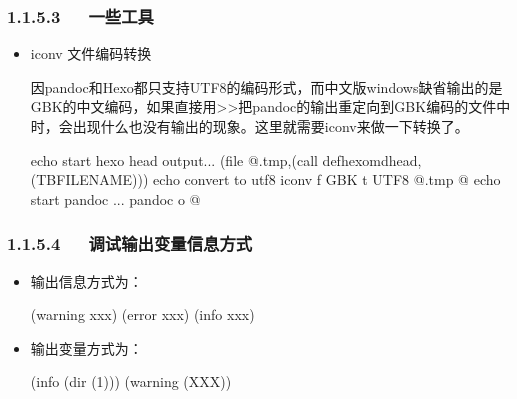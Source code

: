 \documentclass[letterpaper,12pt,english]{sphinxmanual}
\begin{document}
\subsubsection{1.1.5.3   一些工具}
\label{\detokenize{001software/001install/make:id17}}\begin{itemize}
\item {} 
iconv 文件编码转换

因pandoc和Hexo都只支持UTF\sphinxhyphen{}8的编码形式，而中文版windows缺省输出的是GBK的中文编码，如果直接用>>把pandoc的输出重定向到GBK编码的文件中时，会出现什么也没有输出的现象。这里就需要iconv来做一下转换了。

\begin{sphinxVerbatim}[commandchars=\\\{\}]
echo start hexo head output...
\PYGZdl{}\PYGZdl{}(file \PYGZgt{}\PYGZdl{}\PYGZdl{}@.tmp,\PYGZdl{}\PYGZdl{}(call def\PYGZus{}hexo\PYGZus{}md\PYGZus{}head,\PYGZdl{}\PYGZdl{}(TBFILENAME)))
echo convert to utf8
iconv \PYGZhy{}f GBK \PYGZhy{}t UTF\PYGZhy{}8 \PYGZdl{}\PYGZdl{}@.tmp \PYGZgt{}\PYGZdl{}\PYGZdl{}@
echo start pandoc ...
pandoc \PYGZdl{}\PYGZdl{}\PYGZlt{} \PYGZhy{}o \PYGZhy{} \PYGZgt{}\PYGZgt{}\PYGZdl{}\PYGZdl{}@
\end{sphinxVerbatim}

\end{itemize}


\subsubsection{1.1.5.4   调试输出变量信息方式}
\label{\detokenize{001software/001install/make:id18}}\begin{itemize}
\item {} 
输出信息方式为：

\begin{sphinxVerbatim}[commandchars=\\\{\}]
\PYGZdl{}(warning xxx)
\PYGZdl{}(error xxx)
\PYGZdl{}(info xxx)
\end{sphinxVerbatim}

\item {} 
输出变量方式为：

\begin{sphinxVerbatim}[commandchars=\\\{\}]
\PYGZdl{}(info \PYGZdl{}(dir \PYGZdl{}(1)))
\PYGZdl{}(warning  \PYGZdl{}(XXX))
\end{sphinxVerbatim}

\end{itemize}
\end{document}
